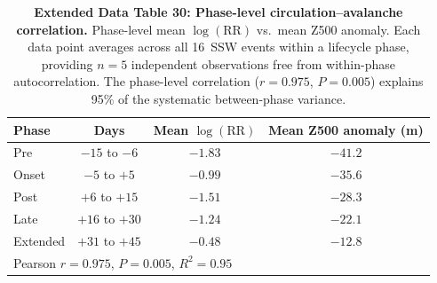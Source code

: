 \documentclass[11pt,letterpaper]{article}
\begin{document}
\begin{table}[!ht]
\centering
\caption{\textbf{Extended Data Table 30: Phase-level circulation--avalanche correlation.}
Phase-level mean $\log(\mathrm{RR})$ vs.\ mean Z500 anomaly. Each data point averages across all 16~SSW events within a lifecycle phase, providing $n = 5$ independent observations free from within-phase autocorrelation. The phase-level correlation ($r = 0.975$, $P = 0.005$) explains 95\% of the systematic between-phase variance.}
\label{tab:phase_correlation}
\small
\begin{tabular}{lccc}
\toprule
Phase & Days & Mean $\log(\mathrm{RR})$ & Mean Z500 anomaly (m) \\
\midrule
Pre & $-15$ to $-6$ & $-1.83$ & $-41.2$ \\
Onset & $-5$ to $+5$ & $-0.99$ & $-35.6$ \\
Post & $+6$ to $+15$ & $-1.51$ & $-28.3$ \\
Late & $+16$ to $+30$ & $-1.24$ & $-22.1$ \\
Extended & $+31$ to $+45$ & $-0.48$ & $-12.8$ \\
\midrule
\multicolumn{4}{l}{Pearson $r = 0.975$, $P = 0.005$, $R^2 = 0.95$} \\
\bottomrule
\end{tabular}
\end{table}
\end{document}

